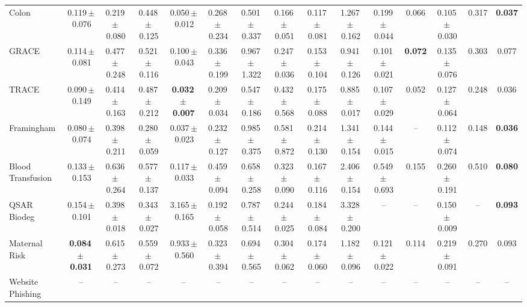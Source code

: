 \documentclass[8pt]{extarticle}
\begin{document}
\begin{longtable}{l*{14}{c}}
Colon & 0.119\,$\pm$\,0.076 & 0.219\,$\pm$\,0.080 & 0.448\,$\pm$\,0.125 & 0.050\,$\pm$\,0.012 & 0.268\,$\pm$\,0.234 & 0.501\,$\pm$\,0.337 & 0.166\,$\pm$\,0.051 & 0.117\,$\pm$\,0.081 & 1.267\,$\pm$\,0.162 & 0.199\,$\pm$\,0.044 & 0.066 & 0.105\,$\pm$\,0.030 & 0.317 & \textbf{0.037} \\
GRACE & 0.114\,$\pm$\,0.081 & 0.477\,$\pm$\,0.248 & 0.521\,$\pm$\,0.116 & 0.100\,$\pm$\,0.043 & 0.336\,$\pm$\,0.199 & 0.967\,$\pm$\,1.322 & 0.247\,$\pm$\,0.036 & 0.153\,$\pm$\,0.104 & 0.941\,$\pm$\,0.126 & 0.101\,$\pm$\,0.021 & \textbf{0.072} & 0.135\,$\pm$\,0.076 & 0.303 & 0.077 \\
TRACE & 0.090\,$\pm$\,0.149 & 0.414\,$\pm$\,0.163 & 0.487\,$\pm$\,0.212 & \textbf{0.032\,$\pm$\,0.007} & 0.209\,$\pm$\,0.034 & 0.547\,$\pm$\,0.186 & 0.432\,$\pm$\,0.568 & 0.175\,$\pm$\,0.088 & 0.885\,$\pm$\,0.017 & 0.107\,$\pm$\,0.029 & 0.052 & 0.127\,$\pm$\,0.064 & 0.248 & 0.036 \\
Framingham & 0.080\,$\pm$\,0.074 & 0.398\,$\pm$\,0.211 & 0.280\,$\pm$\,0.059 & 0.037\,$\pm$\,0.023 & 0.232\,$\pm$\,0.127 & 0.985\,$\pm$\,0.375 & 0.581\,$\pm$\,0.872 & 0.214\,$\pm$\,0.130 & 1.341\,$\pm$\,0.154 & 0.144\,$\pm$\,0.015 & -- & 0.112\,$\pm$\,0.074 & 0.148 & \textbf{0.036} \\
Blood Transfusion & 0.133\,$\pm$\,0.153 & 0.636\,$\pm$\,0.264 & 0.577\,$\pm$\,0.137 & 0.117\,$\pm$\,0.033 & 0.459\,$\pm$\,0.094 & 0.658\,$\pm$\,0.258 & 0.323\,$\pm$\,0.090 & 0.167\,$\pm$\,0.116 & 2.406\,$\pm$\,0.154 & 0.549\,$\pm$\,0.693 & 0.155 & 0.260\,$\pm$\,0.191 & 0.510 & \textbf{0.080} \\
QSAR Biodeg & 0.154\,$\pm$\,0.101 & 0.398\,$\pm$\,0.018 & 0.343\,$\pm$\,0.027 & 3.165\,$\pm$\,0.165 & 0.192\,$\pm$\,0.058 & 0.787\,$\pm$\,0.514 & 0.244\,$\pm$\,0.025 & 0.184\,$\pm$\,0.084 & 3.328\,$\pm$\,0.200 & -- & -- & 0.150\,$\pm$\,0.009 & -- & \textbf{0.093} \\
Maternal Risk & \textbf{0.084\,$\pm$\,0.031} & 0.615\,$\pm$\,0.273 & 0.559\,$\pm$\,0.072 & 0.933\,$\pm$\,0.560 & 0.323\,$\pm$\,0.394 & 0.694\,$\pm$\,0.565 & 0.304\,$\pm$\,0.062 & 0.174\,$\pm$\,0.060 & 1.182\,$\pm$\,0.096 & 0.121\,$\pm$\,0.022 & 0.114 & 0.219\,$\pm$\,0.091 & 0.270 & 0.093 \\
Website Phishing & -- & -- & -- & -- & -- & -- & -- & -- & -- & -- & -- & -- & -- & -- \\
\end{longtable}
\end{document}
